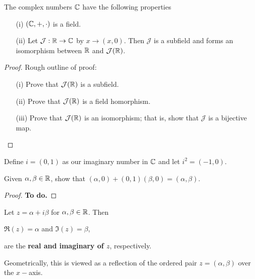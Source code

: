 \documentclass[a4paper]{article}
\begin{document}
\begin{lemma} The complex numbers \( \mathbb{C}  \) have the following properties
    \begin{enumerate}
        \item[(i)] \( (\mathbb{C}, +, \cdot) \) is a field.
        \item[(ii)] Let \( \mathcal{J}: \mathbb{R} \to \mathbb{C}  \) by \( x \to (x,0) \). Then \( \mathcal{J}  \) is a subfield and forms an isomorphism between \( \mathbb{R}  \) and \( \mathcal{J}(\mathbb{R} ) \).
    \end{enumerate}
\end{lemma}

\begin{proof}
Rough outline of proof:
\begin{enumerate}
    \item[(i)] Prove that \( \mathcal{J}(\mathbb{R} ) \) is a subfield.
    \item[(ii)] Prove that \( \mathcal{J}(\mathbb{R}) \) is a field homorphism.
    \item[(iii)] Prove that \( \mathcal{J}(\mathbb{R}) \) is an isomorphism; that is, show that \( \mathcal{J} \) is a bijective map.
\end{enumerate}
\end{proof}

\begin{definition}[Constructing a solution for \( x^2 + 1 = 0  \)]
   Define \( i = (0,1) \) as our imaginary number in \( \mathbb{C}  \) and let \( i^{2} = (-1,0) \). 
\end{definition}


\begin{prop}
    Given \( \alpha, \beta \in \mathbb{R}  \), show that \( (\alpha, 0 ) + (0,1)(\beta, 0) = (\alpha, \beta) \). 
\end{prop}
\begin{proof}
\textbf{To do.}
\end{proof}

\begin{definition}
   Let \( z = \alpha + i \beta  \) for \( \alpha, \beta \in \mathbb{R}  \). Then  
   \begin{center}
       \( \Re(z) = \alpha  \) and \( \Im(z) = \beta   \),
   \end{center}
   are the \textbf{real and imaginary of \( z  \)}, respectively.
\end{definition}

Geometrically, this is viewed as a reflection of the ordered pair \( z = (\alpha, \beta)  \) over the \( x- \)axis.
\end{document}
